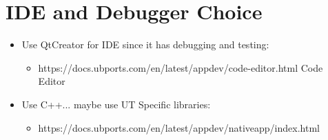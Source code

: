 \section{IDE and Debugger Choice}


\begin{itemize}
	\item Use QtCreator for IDE since it has debugging and testing:
	\begin{itemize}
		\item https://docs.ubports.com/en/latest/appdev/code-editor.html
	Code Editor
	\end{itemize}
\end{itemize}


\begin{itemize}
	\item Use C++... maybe use UT Specific libraries:
	\begin{itemize}
		\item https://docs.ubports.com/en/latest/appdev/nativeapp/index.html
	\end{itemize}
\end{itemize}
